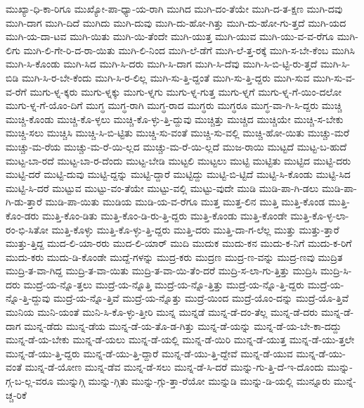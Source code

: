 {ಮುಖ್ಯಾ-ಧಿ-ಕಾ-ರಿಗೂ
ಮುಖ್ಯೋ-ಪಾ-ಧ್ಯಾ-ಯ-ರಾಗಿ
ಮುಗಿದ
ಮುಗಿ-ದಂ-ತೆಯೇ
ಮುಗಿ-ದ-ತ-ಕ್ಷಣ
ಮುಗಿ-ದವು
ಮುಗಿ-ದಾಗ
ಮುಗಿ-ದಿದೆ
ಮುಗಿದು
ಮುಗಿ-ದುವು
ಮುಗಿ-ದು-ಹೋ-ಗಿತ್ತು
ಮುಗಿ-ದು-ಹೋ-ಗು-ತ್ತದೆ
ಮುಗಿ-ಯದ
ಮುಗಿ-ಯ-ದಾ-ಟವ
ಮುಗಿ-ಯಿತು
ಮುಗಿ-ಯಿ-ತೆಂದೇ
ಮುಗಿ-ಯುತ್ತ
ಮುಗಿ-ಯುವ
ಮುಗಿ-ಯು-ವ-ವ-ರೆಗೂ
ಮುಗಿ-ಲಿಗು
ಮುಗಿ-ಲಿ-ಗೇ-ರಿ-ದ-ರಾ-ಯಿತು
ಮುಗಿ-ಲಿ-ನಿಂದ
ಮುಗಿ-ಲೆ-ಡೆಗೆ
ಮುಗಿ-ಲೆ-ತ್ತ-ರಕ್ಕೆ
ಮುಗಿ-ಸ-ಬೇ-ಕೆಂಬ
ಮುಗಿಸಿ
ಮುಗಿ-ಸಿ-ಕೊಂಡು
ಮುಗಿ-ಸಿದ
ಮುಗಿ-ಸಿ-ದರು
ಮುಗಿ-ಸಿ-ದಾಗ
ಮುಗಿ-ಸಿ-ದೆವು
ಮುಗಿ-ಸಿ-ಬಿ-ಟ್ಟಿ-ರು-ತ್ತದೆ
ಮುಗಿ-ಸಿ-ಬಿಡಿ
ಮುಗಿ-ಸಿ-ರ-ಬೇ-ಕೆಂದು
ಮುಗಿ-ಸಿ-ರ-ಲಿಲ್ಲ
ಮುಗಿ-ಸು-ತ್ತಿ-ದ್ದಂತೆ
ಮುಗಿ-ಸು-ತ್ತಿ-ದ್ದರು
ಮುಗಿ-ಸುವ
ಮುಗಿ-ಸು-ವ-ವ-ರೆಗೆ
ಮುಗು-ಳ್ನ-ಕ್ಕರು
ಮುಗು-ಳ್ನಕ್ಕು
ಮುಗು-ಳ್ನಗು
ಮುಗು-ಳ್ನ-ಗುತ್ತ
ಮುಗು-ಳ್ನಗೆ
ಮುಗು-ಳ್ನ-ಗೆ-ಯಿಂ-ದಲೋ
ಮುಗು-ಳ್ನ-ಗೆ-ಯೊಂ-ದಿಗೆ
ಮುಗ್ಧ
ಮುಗ್ಧ-ರಾಗಿ
ಮುಗ್ಧ-ರಾದ
ಮುಗ್ಧರು
ಮುಗ್ಧರೂ
ಮುಗ್ಧ-ವಾ-ಗಿ-ಸಿ-ದ್ದರು
ಮುಚ್ಚಿ
ಮುಚ್ಚಿ-ಕೊಂಡು
ಮುಚ್ಚಿ-ಕೊ-ಳ್ಳಲು
ಮುಚ್ಚಿ-ಕೊ-ಳ್ಳು-ತ್ತಿ-ದ್ದುವು
ಮುಚ್ಚಿತ್ತು
ಮುಚ್ಚಿದ
ಮುಚ್ಚಿಯೇ
ಮುಚ್ಚಿ-ಸ-ಬೇಕು
ಮುಚ್ಚಿ-ಸಲು
ಮುಚ್ಚಿಸಿ
ಮುಚ್ಚಿ-ಸಿ-ಬಿ-ಟ್ಟಿತು
ಮುಚ್ಚಿ-ಸು-ವಂತೆ
ಮುಚ್ಚಿ-ಸು-ವಲ್ಲಿ
ಮುಚ್ಚಿ-ಹೋ-ಯಿತು
ಮುಚ್ಚು-ಮರೆ
ಮುಚ್ಚು-ಮ-ರೆಯ
ಮುಚ್ಚು-ಮ-ರೆ-ಯಿ-ಲ್ಲದ
ಮುಚ್ಚು-ಮ-ರೆ-ಯಿ-ಲ್ಲದೆ
ಮುಜ-ರಾಯಿ
ಮುಟ್ಟದೆ
ಮುಟ್ಟ-ಬ-ಹುದೆ
ಮುಟ್ಟ-ಬಾ-ರದೆ
ಮುಟ್ಟ-ಬಾ-ರ-ದೆಂದು
ಮುಟ್ಟ-ಬೇಡಿ
ಮುಟ್ಟಲಿ
ಮುಟ್ಟಲು
ಮುಟ್ಟಿ
ಮುಟ್ಟಿತು
ಮುಟ್ಟಿದ
ಮುಟ್ಟಿ-ದರು
ಮುಟ್ಟಿ-ದರೆ
ಮುಟ್ಟಿ-ದುವು
ಮುಟ್ಟಿ-ದ್ದನ್ನು
ಮುಟ್ಟಿ-ದ್ದಾರೆ
ಮುಟ್ಟಿದ್ದು
ಮುಟ್ಟಿ-ಬಿ-ಟ್ಟಿದೆ
ಮುಟ್ಟಿ-ಸಿ-ಕೊಂಡು
ಮುಟ್ಟಿ-ಸಿದ
ಮುಟ್ಟಿ-ಸಿ-ದರೆ
ಮುಟ್ಟುವ
ಮುಟ್ಟು-ವಂ-ತೆಯೇ
ಮುಟ್ಟು-ವಲ್ಲಿ
ಮುಟ್ಟು-ವುದೇ
ಮುಡಿ
ಮುಡಿ-ಪಾ-ಗಿ-ಡಲು
ಮುಡಿ-ಪಾ-ಗಿ-ಡು-ತ್ತಾರೆ
ಮುಡಿ-ಪಾ-ಯಿತು
ಮುಡಿಯ
ಮುಡಿ-ಯ-ವ-ರೆಗೂ
ಮುತ್ತ
ಮುತ್ತ-ಲಿನ
ಮುತ್ತಿ
ಮುತ್ತಿ-ಕೊಂಡ
ಮುತ್ತಿ-ಕೊಂ-ಡರು
ಮುತ್ತಿ-ಕೊಂ-ಡಿತು
ಮುತ್ತಿ-ಕೊಂ-ಡಿ-ರು-ತ್ತಿ-ದ್ದರು
ಮುತ್ತಿ-ಕೊಂಡು
ಮುತ್ತಿ-ಕೊಂಡೇ
ಮುತ್ತಿ-ಕೊ-ಳ್ಳ-ಲಾ-ರಂ-ಭಿ-ಸಿತೋ
ಮುತ್ತಿ-ಕೊಳ್ಳು
ಮುತ್ತಿ-ಕೊ-ಳ್ಳು-ತ್ತಿ-ದ್ದರು
ಮುತ್ತಿ-ದರು
ಮುತ್ತಿ-ದಾ-ಗ-ಲೆಲ್ಲ
ಮುತ್ತು
ಮುತ್ತು-ತ್ತಾರೆ
ಮುತ್ತು-ತ್ತಿದ್ದ
ಮುದ-ಲಿ-ಯಾ-ರರು
ಮುದ-ಲಿ-ಯಾರ್
ಮುದಿ
ಮುದುಕ
ಮುದು-ಕನ
ಮುದು-ಕ-ನಿಗೆ
ಮುದು-ಕ-ರಿಗೆ
ಮುದು-ಕರು
ಮುದು-ಡಿ-ಕೊಂಡೇ
ಮುದ್ದೆ-ಗಳನ್ನು
ಮುದ್ರ-ಕರು
ಮುದ್ರಣ
ಮುದ್ರ-ಣ-ವನ್ನು
ಮುದ್ರ-ಣವು
ಮುದ್ರಿತ
ಮುದ್ರಿ-ತ-ವಾ-ಗಿದ್ದ
ಮುದ್ರಿ-ತ-ವಾ-ಯಿತು
ಮುದ್ರಿ-ತ-ವಾ-ಯಿ-ತೆಂ-ದರೆ
ಮುದ್ರಿ-ಸ-ಲಾ-ಗು-ತ್ತಿತ್ತು
ಮುದ್ರಿಸಿ
ಮುದ್ರಿ-ಸಿ-ದರು
ಮುದ್ರೆ-ಯ-ನ್ನೊ-ತ್ತಲು
ಮುದ್ರೆ-ಯ-ನ್ನೊತ್ತಿ
ಮುದ್ರೆ-ಯ-ನ್ನೊ-ತ್ತಿತ್ತು
ಮುದ್ರೆ-ಯ-ನ್ನೊ-ತ್ತಿ-ದ್ದರು
ಮುದ್ರೆ-ಯ-ನ್ನೊ-ತ್ತಿ-ದ್ದುವು
ಮುದ್ರೆ-ಯ-ನ್ನೊ-ತ್ತಿವೆ
ಮುದ್ರೆ-ಯ-ನ್ನೊತ್ತು
ಮುದ್ರೆ-ಯಿಂದ
ಮುದ್ರೆ-ಯೊಂ-ದನ್ನು
ಮುದ್ರೆ-ಯೊ-ತ್ತಿವೆ
ಮುನಿಯ
ಮುನಿ-ಯಂತೆ
ಮುನಿ-ಸಿ-ಕೊ-ಳ್ಳು-ತ್ತೀರಿ
ಮುನ್ನ
ಮುನ್ನಡೆ
ಮುನ್ನ-ಡೆ-ದಂ-ತೆಲ್ಲ
ಮುನ್ನ-ಡೆ-ದರು
ಮುನ್ನ-ಡೆ-ದಾಗ
ಮುನ್ನ-ಡೆದು
ಮುನ್ನ-ಡೆಯ
ಮುನ್ನ-ಡೆ-ಯ-ತೊ-ಡ-ಗಿತ್ತು
ಮುನ್ನ-ಡೆ-ಯನ್ನು
ಮುನ್ನ-ಡೆ-ಯ-ಬೇ-ಕಾ-ದದ್ದು
ಮುನ್ನ-ಡೆ-ಯ-ಬೇಕು
ಮುನ್ನ-ಡೆ-ಯಲು
ಮುನ್ನ-ಡೆ-ಯಲ್ಲಿ
ಮುನ್ನ-ಡೆ-ಯಿರಿ
ಮುನ್ನ-ಡೆ-ಯುತ್ತ
ಮುನ್ನ-ಡೆ-ಯು-ತ್ತಲೇ
ಮುನ್ನ-ಡೆ-ಯು-ತ್ತಿ-ದ್ದರು
ಮುನ್ನ-ಡೆ-ಯು-ತ್ತಿ-ದ್ದಾರೆ
ಮುನ್ನ-ಡೆ-ಯು-ತ್ತಿ-ದ್ದೇವೆ
ಮುನ್ನ-ಡೆ-ಯುವ
ಮುನ್ನ-ಡೆ-ಯು-ವಂತೆ
ಮುನ್ನ-ಡೆ-ಯೋಣ
ಮುನ್ನ-ಡೆವ
ಮುನ್ನ-ಡೆ-ಸಲು
ಮುನ್ನ-ಡೆ-ಸಿ-ದರೆ
ಮುನ್ನು-ಗು-ತ್ತಿ-ದೆ-ಇ-ದೊಂದು
ಮುನ್ನು-ಗ್ಗ-ಬ-ಲ್ಲ-ವರೂ
ಮುನ್ನುಗ್ಗಿ
ಮುನ್ನು-ಗ್ಗಿತು
ಮುನ್ನು-ಗ್ಗು-ತ್ತಾ-ರೆಯೋ
ಮುನ್ನುಡಿ
ಮುನ್ನು-ಡಿ-ಯಲ್ಲಿ
ಮುನ್ನೂರು
ಮುನ್ನೆ-ಚ್ಚ-ರಿಕೆ
}
